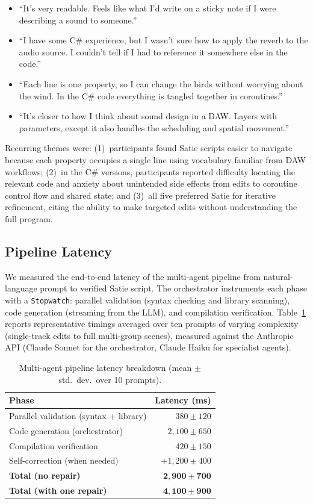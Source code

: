 \documentclass[sigconf,anonymous,review]{nimeart}
\begin{document}
\begin{itemize}
    \item ``It's very readable. Feels like what I'd write on a sticky note if I were describing a sound to someone.''
    \item ``I have some C\# experience, but I wasn't sure how to apply the reverb to the audio source. I couldn't tell if I had to reference it somewhere else in the code.''
    \item ``Each line is one property, so I can change the birds without worrying about the wind. In the C\# code everything is tangled together in coroutines.''
    \item ``It's closer to how I think about sound design in a DAW. Layers with parameters, except it also handles the scheduling and spatial movement.''
\end{itemize}

Recurring themes were: (1)~participants found Satie scripts easier to navigate because each property occupies a single line using vocabulary familiar from DAW workflows; (2)~in the C\# versions, participants reported difficulty locating the relevant code and anxiety about unintended side effects from edits to coroutine control flow and shared state; and (3)~all five preferred Satie for iterative refinement, citing the ability to make targeted edits without understanding the full program.

\subsection{Pipeline Latency}

We measured the end-to-end latency of the multi-agent pipeline from natural-language prompt to verified Satie script. The orchestrator instruments each phase with a \texttt{Stopwatch}: parallel validation (syntax checking and library scanning), code generation (streaming from the LLM), and compilation verification. Table~\ref{tab:latency} reports representative timings averaged over ten prompts of varying complexity (single-track edits to full multi-group scenes), measured against the Anthropic API (Claude Sonnet for the orchestrator, Claude Haiku for specialist agents).

\begin{table}[htbp]
\centering
\small
\caption{Multi-agent pipeline latency breakdown (mean $\pm$ std.\ dev.\ over 10 prompts).}
\label{tab:latency}
\begin{tabular}{lr}
\toprule
\textbf{Phase} & \textbf{Latency (ms)} \\
\midrule
Parallel validation (syntax + library) & $380 \pm 120$ \\
Code generation (orchestrator) & $2{,}100 \pm 650$ \\
Compilation verification & $420 \pm 150$ \\
Self-correction (when needed) & $+1{,}200 \pm 400$ \\
\midrule
\textbf{Total (no repair)} & $\mathbf{2{,}900 \pm 700}$ \\
\textbf{Total (with one repair)} & $\mathbf{4{,}100 \pm 900}$ \\
\bottomrule
\end{tabular}
\end{table}
\end{document}
